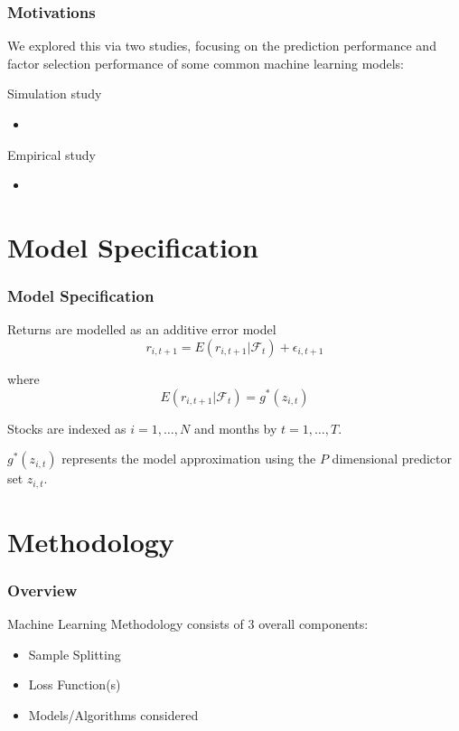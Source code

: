 \documentclass[aspectratio=169]{beamer}
\begin{document}
\begin{frame}
\frametitle{Motivations}
We explored this via two studies, focusing on the prediction performance and factor selection performance of some common machine learning models:

Simulation study
\begin{itemize}
	\item 
\end{itemize}

Empirical study
\begin{itemize}
	\item 
\end{itemize}
\end{frame}

\section{Model Specification}

\begin{frame}
\frametitle{Model Specification}
Returns are modelled as an additive error model
\begin{equation}
	r_{i, t+1} = E(r_{i, t+1} | \mathcal{F}_t) + \epsilon_{i, t+1}
\end{equation}
		
where 
\begin{equation}
	E(r_{i, t+1} | \mathcal{F}_t) = g^*(z_{i,t})
\end{equation}
		
Stocks are indexed as $i = 1, \dots, N$ and months by $t = 1, \dots, T$. 

$g^*(z_{i,t})$ represents the model approximation using the $P$ dimensional predictor set $z_{i,t}$. 
\end{frame}

\section{Methodology}

\begin{frame}
\frametitle{Overview}
Machine Learning Methodology consists of 3 overall components:
\begin{itemize}
	\item Sample Splitting
	\item Loss Function(s)
	\item Models/Algorithms considered
\end{itemize}
\end{frame}
\end{document}
